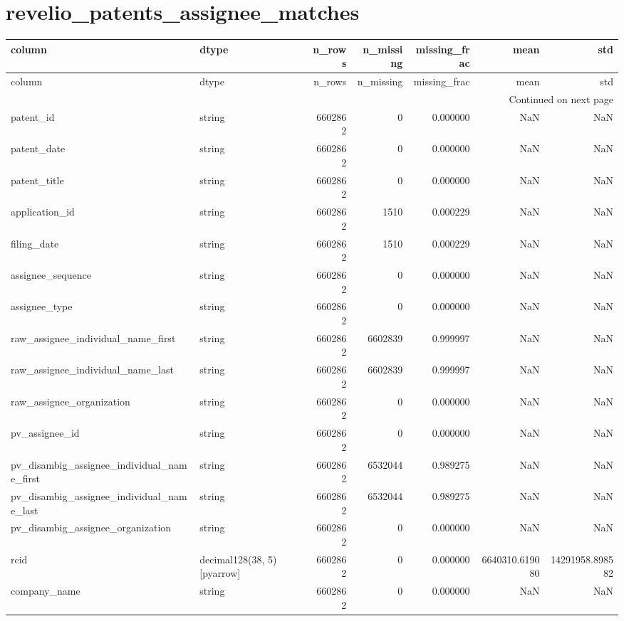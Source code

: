 \documentclass{article}
\begin{document}
\section*{revelio_patents_assignee_matches}
\begin{longtable}{llrrrrr}
\toprule
column & dtype & n_rows & n_missing & missing_frac & mean & std \\
\midrule
\endfirsthead
\toprule
column & dtype & n_rows & n_missing & missing_frac & mean & std \\
\midrule
\endhead
\midrule
\multicolumn{7}{r}{Continued on next page} \\
\midrule
\endfoot
\bottomrule
\endlastfoot
patent_id & string & 6602862 & 0 & 0.000000 & NaN & NaN \\
patent_date & string & 6602862 & 0 & 0.000000 & NaN & NaN \\
patent_title & string & 6602862 & 0 & 0.000000 & NaN & NaN \\
application_id & string & 6602862 & 1510 & 0.000229 & NaN & NaN \\
filing_date & string & 6602862 & 1510 & 0.000229 & NaN & NaN \\
assignee_sequence & string & 6602862 & 0 & 0.000000 & NaN & NaN \\
assignee_type & string & 6602862 & 0 & 0.000000 & NaN & NaN \\
raw_assignee_individual_name_first & string & 6602862 & 6602839 & 0.999997 & NaN & NaN \\
raw_assignee_individual_name_last & string & 6602862 & 6602839 & 0.999997 & NaN & NaN \\
raw_assignee_organization & string & 6602862 & 0 & 0.000000 & NaN & NaN \\
pv_assignee_id & string & 6602862 & 0 & 0.000000 & NaN & NaN \\
pv_disambig_assignee_individual_name_first & string & 6602862 & 6532044 & 0.989275 & NaN & NaN \\
pv_disambig_assignee_individual_name_last & string & 6602862 & 6532044 & 0.989275 & NaN & NaN \\
pv_disambig_assignee_organization & string & 6602862 & 0 & 0.000000 & NaN & NaN \\
rcid & decimal128(38, 5)[pyarrow] & 6602862 & 0 & 0.000000 & 6640310.619080 & 14291958.898582 \\
company_name & string & 6602862 & 0 & 0.000000 & NaN & NaN \\
\end{longtable}
\end{document}
